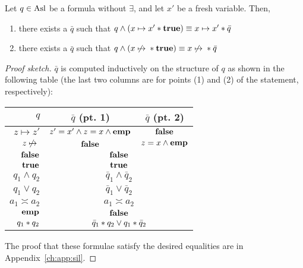 \begin{lemma}\label{lmm:sil:separation-assertion-rewrite}
	Let $q \in \text{Asl}$ be a formula without $\exists$, and let $x'$ be a fresh variable. Then,
	\begin{enumerate}
		\item there exists a $\bar{q}$ such that $q \land (x \mapsto x' * \textbf{true}) \equiv x \mapsto x' * \bar{q}$
		\item there exists a $\bar{q}$ such that $q \land (x \not\mapsto{} * \textbf{true}) \equiv x \not\mapsto{} * \bar{q}$
	\end{enumerate}
\end{lemma}
\begin{proof}[Proof sketch]
	$\bar{q}$ is computed inductively on the structure of $q$ as shown in the following table (the last two columns are for points (1) and (2) of the statement, respectively):

	\begin{center}
		\begin{tabular}{r|c@{\qquad\quad}c@{\qquad\quad}}
			$q$               & $\bar{q}$ (pt. 1)                                                      & $\bar{q}$ (pt. 2)  \\
			\hline
			$z \mapsto z'$    & $z' = x' \land z = x \land \textbf{emp}$                                       & $\textbf{false}$           \\
			$z \not\mapsto{}{}$    & $\textbf{false}$                                                               & $z = x \land \textbf{emp}$ \\
			$\textbf{false}$          & \multicolumn{2}{c}{$\textbf{false}$}                                                                \\
			$\textbf{true}$           & \multicolumn{2}{c}{$\textbf{true}$}                                                                 \\
			$q_1 \land q_2$   & \multicolumn{2}{c}{$\bar{q}_1 \land \bar{q}_2$}                                             \\
			$q_1 \lor q_2$    & \multicolumn{2}{c}{$\bar{q}_1 \lor \bar{q}_2$}                                              \\
			$a_1 \asymp a_2$  & \multicolumn{2}{c}{$a_1 \asymp a_2$}                                                        \\
			$\textbf{emp}$            & \multicolumn{2}{c}{$\textbf{false}$}                                                                \\
			$q_1 * q_2$ & \multicolumn{2}{c}{$\bar{q}_1 * q_2 \lor q_1 * \bar{q}_2$}
		\end{tabular}
	\end{center}

	The proof that these formulae satisfy the desired equalities are in Appendix~\ref{ch:app:sil}.
\end{proof}

